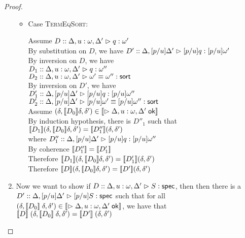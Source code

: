 \begin{proof}
\begin{enumerate}
\begin{itemize}
  \item Case \textsc{TermEqSort}:
    \begin{tabbedproof}
      \oo Assume $D :: \judgeA[{\Delta, u:\omega,\Delta'}]{q}{\omega'}$ \\
      \oo By substitution on $D$, we have 
          $D' :: \judgeA[{\Delta, [p/u]\Delta'}]{[p/u]q}{[p/u]\omega'}$ \\
      \ooo By inversion on $D$, we have \\
      \oooo $D_1 :: \judgeA[{\Delta, u:\omega,\Delta'}]{q}{\omega''}$ \\
      \oooo $D_2 :: \judgeSortEq[{\Delta, u:\omega,\Delta'}]{\omega'}{\omega''}$ \\
      \ooo By inversion on $D'$, we have \\
      \oooo $D'_1 ::      \judgeA[{\Delta, [p/u]\Delta'}]{[p/u]q}{[p/u]\omega''}$ \\
      \oooo $D'_2 :: \judgeSortEq[{\Delta, [p/u]\Delta'}]{[p/u]\omega'}{[p/u]\omega''}$ \\
      \ooo Assume $(\delta, \interp{D_0}\delta, \delta') \in 
                   \interp{\judgeACtx{\Delta, u:\omega,\Delta'}}$ \\
      \oooo By induction hypothesis, there is $D''_1$ such that \\
      \oooox $\interp{D_1}(\delta, \interp{D_0}\delta, \delta') = 
              \interp{D''_1}(\delta, \delta')$ \\
      \oooo where $D''_1 :: \judgeA[{\Delta, [p/u]\Delta'}]{[p/u]q}{[p/u]\omega''}$ \\
      \oooo By coherence $\interp{D''_1} = \interp{D'_1}$ \\
      \oooo Therefore $\interp{D_1}(\delta, \interp{D_0}\delta, \delta') = 
                       \interp{D'_1}(\delta, \delta')$ \\
      \oooo Therefore $\interp{D}(\delta, \interp{D_0}\delta, \delta') = 
                       \interp{D'}(\delta, \delta')$ \\
    \end{tabbedproof}
  \end{itemize}

\item Now we want to show if $D :: \judgeS[{\Delta, u:\omega, \Delta'}]{S}$, then
  then there is a $D' :: \judgeS[{\Delta, [p/u]\Delta'}]{[p/u]S}$ such
  that for all $(\delta, \interp{D_0}\;\delta, \delta') \in 
                \interp{\judgeACtx{\Delta, u:\omega, \Delta'}}$, 
  we have that $\interp{D}\;(\delta, \interp{D_0}\;\delta, \delta') = \interp{D'}\;(\delta, \delta')$ 


\end{enumerate}
\end{proof}
